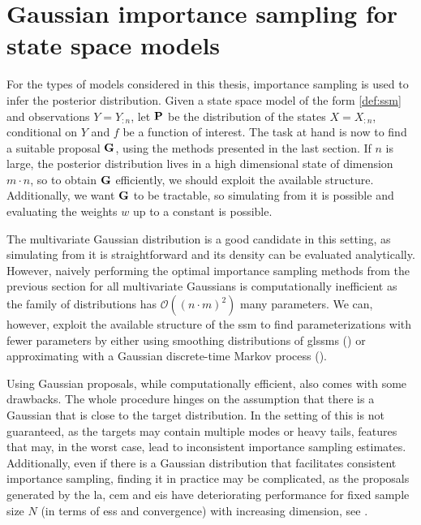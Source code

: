 \section{Gaussian importance sampling for state space models}
\label{sec:gaussian_importance_sampling_for_state_space_models}

For the types of models considered in this thesis, importance sampling is used to infer the posterior distribution. Given a state space model of the form \eqref{def:ssm} and observations $Y = Y_{:n}$, let $\P$ be the distribution of the states $X=X_{:n}$, conditional on $Y$ and $f$ be a function of interest. The task at hand is now to find a suitable proposal $\G$, using the methods presented in the last section. If $n$ is large, the posterior distribution lives in a high dimensional state of dimension $m\cdot n$, so to obtain $\G$ efficiently, we should exploit the available structure. Additionally, we want $\G$ to be tractable, so simulating from it is possible and evaluating the weights $w$ up to a constant is possible. 

The multivariate Gaussian distribution is a good candidate in this setting, as simulating from it is straightforward and its density can be evaluated analytically. However, naively performing the optimal importance sampling methods from the previous section for all multivariate Gaussians is computationally inefficient as the family of distributions has $\mathcal O((n\cdot m)^{2})$ many parameters. We can, however, exploit the available structure of the \gls{ssm} to find parameterizations with fewer parameters by either using smoothing distributions of \glspl{glssm} () or approximating with a Gaussian discrete-time Markov process (). 

Using Gaussian proposals, while computationally efficient, also comes with some drawbacks. The whole procedure hinges on the assumption that there is a Gaussian that is close to the target distribution. In the setting of  this is not guaranteed, as the targets may contain multiple modes or heavy tails, features that may, in the worst case, lead to inconsistent importance sampling estimates. %
Additionally, even if there is a Gaussian distribution that facilitates consistent importance sampling, finding it in practice may be complicated, as the proposals generated by the \gls{la}, \gls{cem} and \gls{eis} have deteriorating performance for fixed sample size $N$ (in terms of \acrshort{ess} and convergence) with increasing dimension, see .

